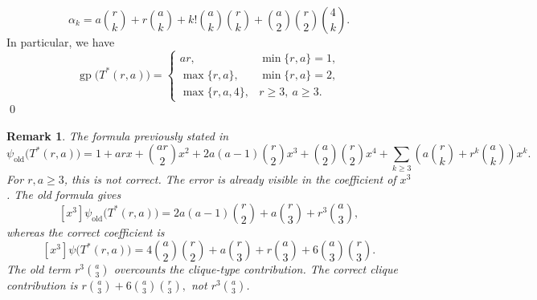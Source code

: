 \documentclass[12pt,twoside]{article}
\newtheorem{remark}[theorem]{Remark}
\renewenvironment{proof}{{\noindent\bfseries Proof.}}{\qed}
\begin{document}
\begin{proof}
			$$
			\alpha_k = a\binom{r}{k} + 	r\binom{a}{k} + 	k!\binom{a}{k}\binom{r}{k} + \binom{a}{2}\binom{r}{2}\binom{4}{k}.
			$$
			In particular, we have
			$$
			\operatorname{gp}\bigl(T^*(r,a)\bigr)=
			\begin{cases}
				ar, & \min\{r,a\}=1,\\
				\max\{r,a\}, & \min\{r,a\}=2,\\
				\max\{r,a,4\}, & r\ge 3,\ a\ge 3.
			\end{cases}
			$$
		\end{proof}
		
		\begin{remark}\label{rem:old-vs-new-Tstar}
			The formula previously stated in \cite{0}
			$$
			\psi_{\mathrm{old}}\bigl(T^*(r,a)\bigr)
			=
			1+arx+\binom{ar}{2}x^2
			+2a(a-1)\binom{r}{2}x^3
			+\binom{a}{2}\binom{r}{2}x^4
			+\sum_{k\ge 3}\left(a\binom{r}{k}+r^k\binom{a}{k}\right)x^k.
			$$
			For $r,a\ge 3$, this is not correct. The error is already visible in the coefficient of $x^3$. The old formula gives
			$$
			[x^3]\psi_{\mathrm{old}}\bigl(T^*(r,a)\bigr)
			=
			2a(a-1)\binom{r}{2}
			+
			a\binom{r}{3}
			+
			r^3\binom{a}{3},
			$$
			whereas the correct coefficient is
			$$
			[x^3]\psi\bigl(T^*(r,a)\bigr)
			=
			4\binom{a}{2}\binom{r}{2}
			+
			a\binom{r}{3}
			+
			r\binom{a}{3}
			+
			6\binom{a}{3}\binom{r}{3}.
			$$
			The old term $r^3\binom{a}{3}$ overcounts the clique-type contribution. The correct clique contribution is
			$
			r\binom{a}{3}+6\binom{a}{3}\binom{r}{3},
			$	not $r^3\binom{a}{3}$.
		\end{remark}
		
\end{document}
